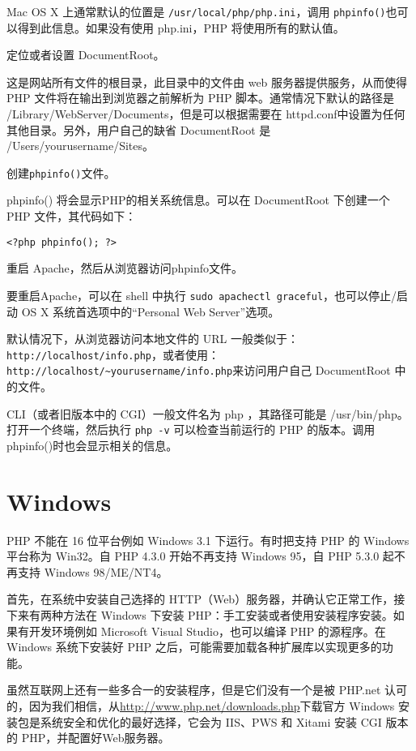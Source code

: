 \begin{compactenum}
Mac OS X 上通常默认的位置是 \texttt{/usr/local/php/php.ini}，调用 \texttt{phpinfo()}也可以得到此信息。如果没有使用 php.ini，PHP 将使用所有的默认值。

\item 定位或者设置 DocumentRoot。

这是网站所有文件的根目录，此目录中的文件由 web 服务器提供服务，从而使得 PHP 文件将在输出到浏览器之前解析为 PHP 脚本。通常情况下默认的路径是 /Library/WebServer/Documents，但是可以根据需要在 httpd.conf中设置为任何其他目录。另外，用户自己的缺省 DocumentRoot 是 /Users/yourusername/Sites。

\item 创建\texttt{phpinfo()}文件。

phpinfo() 将会显示PHP的相关系统信息。可以在 DocumentRoot 下创建一个 PHP 文件，其代码如下：

\indent \indent \verb|<?php phpinfo(); ?>|

\item 重启 Apache，然后从浏览器访问phpinfo文件。

要重启Apache，可以在 shell 中执行 \texttt{sudo apachectl graceful}，也可以停止/启动 OS X 系统首选项中的“Personal Web Server”选项。

默认情况下，从浏览器访问本地文件的 URL 一般类似于：\texttt{http://localhost/info.php}，或者使用：\verb|http://localhost/~yourusername/info.php|来访问用户自己 DocumentRoot 中的文件。


\end{compactenum}

CLI（或者旧版本中的 CGI）一般文件名为 php ，其路径可能是 /usr/bin/php。打开一个终端，然后执行 \texttt{php -v} 可以检查当前运行的 PHP 的版本。调用 phpinfo()时也会显示相关的信息。



\section{Windows}

PHP 不能在 16 位平台例如 Windows 3.1 下运行。有时把支持 PHP 的 Windows 平台称为 Win32。自 PHP 4.3.0 开始不再支持 Windows 95，自 PHP 5.3.0 起不再支持 Windows 98/ME/NT4。

首先，在系统中安装自己选择的 HTTP（Web）服务器，并确认它正常工作，接下来有两种方法在 Windows 下安装 PHP：手工安装或者使用安装程序安装。如果有开发环境例如 Microsoft Visual Studio，也可以编译 PHP 的源程序。在 Windows 系统下安装好 PHP 之后，可能需要加载各种扩展库以实现更多的功能。

虽然互联网上还有一些多合一的安装程序，但是它们没有一个是被 PHP.net 认可的，因为我们相信，从\url{http://www.php.net/downloads.php}下载官方 Windows 安装包是系统安全和优化的最好选择，它会为 IIS、PWS 和 Xitami 安装 CGI 版本的 PHP，并配置好Web服务器。

